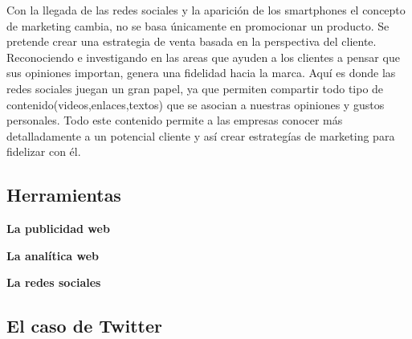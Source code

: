 \vspace{5 mm}


Con la llegada de las redes sociales y la aparición de los smartphones el concepto de marketing cambia, no se basa únicamente en promocionar un producto. Se pretende crear una estrategia de venta basada en la perspectiva del cliente. Reconociendo e investigando en las areas que ayuden a los clientes a pensar que sus opiniones importan, genera una fidelidad hacia la marca. Aquí es donde las redes sociales juegan un gran papel, ya que permiten compartir todo tipo de contenido(videos,enlaces,textos) que se asocian a nuestras opiniones y gustos personales. Todo este contenido permite a las empresas conocer más detalladamente a un potencial cliente y así crear estrategías de marketing para fidelizar con él.


\subsection{Herramientas}

\vspace{5 mm}

\textbf{La publicidad web} 

\vspace{5 mm}


\vspace{5 mm}

\textbf{La analítica web} 

\vspace{5 mm}


\vspace{5 mm}

\textbf{La redes sociales} 

\vspace{5 mm}

\subsection{El caso de Twitter}